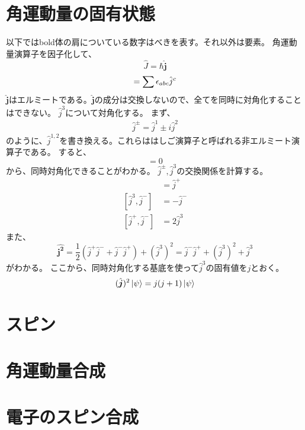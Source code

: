 \documentclass{jsarticle}
\newcommand{\half}{\frac{1}{2}}
\newcommand{\beq}{\begin{equation}}
\newcommand{\eeq}{\end{equation}}
\newcommand{\hj}{\hat{j}}
\newcommand{\hjm}{\hat{j}^{-}}
\newcommand{\hjp}{\hat{j}^{+}}
\newcommand{\hbj}{\hat{\bm{j}}}
\newcommand{\hbjt}{\hat{\bm{j^2}}}
\newcommand{\hcj}{\hat{J}}
\begin{document}
\section{角運動量の固有状態}
以下ではbold体の肩についている数字はべきを表す。それ以外は要素。
角運動量演算子を因子化して、
\beq
    \hcj = \hbar \hbj
\eeq
\beq
[\hj^a,\hj^b] = \sum \epsilon_{abc}\hj^c\\
\eeq
$\hbj$はエルミートである。$\hbj$の成分は交換しないので、全てを同時に対角化することはできない。
$\hj^3$について対角化する。
まず、
\begin{align}
    \hj^{\pm} = \hj^1 \pm i \hj^2
\end{align}
のように、$\hj^{1,2}$を書き換える。これらははしご演算子と呼ばれる非エルミート演算子である。
すると、
\beq
[\hbjt,\hj^3] = 0
\eeq
から、同時対角化できることがわかる。
$\hj^{\pm},\hj^3$の交換関係を計算する。
\begin{align}
    [\hj^3, \hj^{+}] &= \hj^{+}\\
[\hj^3, \hj^{-}] &= -\hj^{-}\\
[\hj^{+}, \hj^{-}] &= 2\hj^{3}
\end{align}
また、
\beq
\hbjt = \half (\hjp\hjm + \hjm\hjp) + (\hj^3)^2 =  \hjm\hjp + (\hj^3)^2 + \hj^3
\eeq
がわかる。
ここから、同時対角化する基底を使って$\hj^3$の固有値を$j$とおく。
\beq
    (\hbj)^2 \ket{\psi} = j(j+1)\ket{\psi}
\eeq

\section{スピン}
\section{角運動量合成}
\section{電子のスピン合成}
\end{document}
